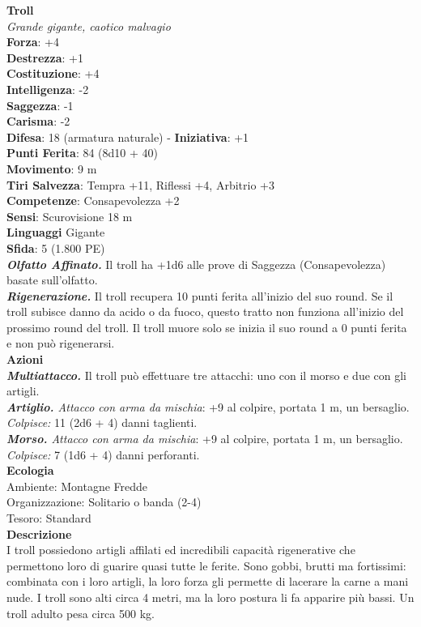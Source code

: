 \begin{multicols}{2}
\medskip\textbf{Troll}\\
\emph{Grande gigante, caotico malvagio}\\
\textbf{Forza}: +4\\
\textbf{Destrezza}: +1\\
\textbf{Costituzione}: +4\\
\textbf{Intelligenza}: -2\\
\textbf{Saggezza}: -1\\
\textbf{Carisma}: -2\\
\textbf{Difesa}: 18 (armatura naturale) - \textbf{Iniziativa}: +1\\
\textbf{Punti Ferita}: 84 (8d10 + 40)\\
\textbf{Movimento}: 9 m\\
\textbf{Tiri Salvezza}: Tempra +11, Riflessi +4, Arbitrio +3\\
\textbf{Competenze}: Consapevolezza +2\\
\textbf{Sensi}: Scurovisione 18 m\\
\textbf{Linguaggi} Gigante\\
\textbf{Sfida}: 5 (1.800 PE)\smallskip\\
\emph{\textbf{Olfatto Affinato.}} Il troll ha +1d6 alle prove di Saggezza (Consapevolezza) basate sull'olfatto.\\
\emph{\textbf{Rigenerazione.}} Il troll recupera 10 punti ferita all'inizio del suo round. Se il troll subisce danno da acido o da fuoco, questo tratto non funziona all'inizio del prossimo round del troll. Il troll muore solo se inizia il suo round a 0 punti ferita e non può rigenerarsi.\\
\smallskip\textbf{Azioni}\\
\emph{\textbf{Multiattacco.}} Il troll può effettuare tre attacchi: uno con il morso e due con gli artigli.\\
\emph{\textbf{Artiglio.} Attacco con arma da mischia}: +9 al colpire, portata 1 m, un bersaglio.\\
\emph{Colpisce:} 11 (2d6 + 4) danni taglienti.\\
\emph{\textbf{Morso.} Attacco con arma da mischia}: +9 al colpire, portata 1 m, un bersaglio.\\
\emph{Colpisce:} 7 (1d6 + 4) danni perforanti.\\
\textbf{Ecologia}\\
Ambiente: Montagne Fredde\\
Organizzazione: Solitario o banda (2-4)\\
Tesoro: Standard\\
\textbf{Descrizione}\\
I troll possiedono artigli affilati ed incredibili capacità rigenerative che permettono loro di guarire quasi tutte le ferite. Sono gobbi, brutti ma fortissimi: combinata con i loro artigli, la loro forza gli permette di lacerare la carne a mani nude. I troll sono alti circa 4 metri, ma la loro postura li fa apparire più bassi. Un troll adulto pesa circa 500 kg.\\


\end{multicols}
